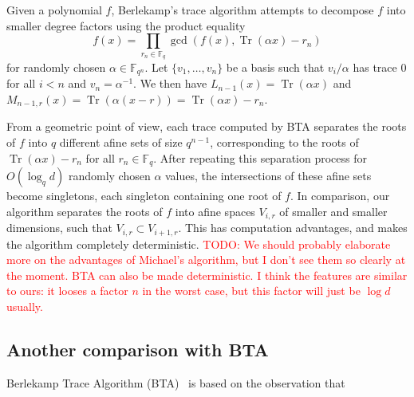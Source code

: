\documentclass{sig-alternate}
\newcommand{\ff}[1]{\mathbb{F}_{#1}}
\newcommand{\fq}{\ff{q}}
\newcommand{\fqn}{\ff{q^n}}
\newcommand{\dd}{d}
\newcommand{\qq}{q}
\newcommand{\nn}{n}
\DeclareMathOperator{\Tr}{Tr}
\newcounter{algo}
\newcommand{\todo}[1]{\textcolor{red}{TODO: #1}}
\begin{document}
Given a polynomial $f$, Berlekamp's trace algorithm attempts to decompose $f$ into smaller degree factors using the product equality
$$f(x)=\prod_{r_n\in\fq}\gcd\left(f(x),\Tr(\alpha x)-r_n\right)$$
for randomly chosen $\alpha\in\fqn$.
%
Let $\{v_1,\ldots,v_{\nn}\}$ be a basis such that $v_i/\alpha$ has trace 0 for all $i<\nn$ and $v_\nn=\alpha^{-1}$. We then have $L_{\nn-1}(x)=\Tr(\alpha x)$ and $M_{\nn-1,r}(x)=\Tr(\alpha (x-r))=\Tr(\alpha x)-r_\nn$.

From a geometric point of view, each trace computed by BTA separates the roots of $f$ into $q$ different afine sets of size $\qq^{\nn-1}$, corresponding to the roots of $\Tr(\alpha x)-r_\nn$ for all $r_\nn\in\fq$. After repeating this separation process for $O(\log_\qq\dd)$  randomly chosen $\alpha$ values, the intersections of these afine sets become singletons, each singleton containing one root of $f$. 
%
In comparison, our algorithm separates the roots of $f$ into afine spaces $V_{i,r}$ of smaller and smaller dimensions, such that $V_{i,r}\subset V_{i+1,r}$. This has computation advantages, and makes the algorithm completely deterministic.
%
\todo{We should probably elaborate more on the advantages of Michael's algorithm, but I don't see them so clearly at the moment. BTA can also be made deterministic. I think the features are similar to ours: it looses a factor $n$ in the worst case, but this factor will just be $\log d$ usually.}


\subsection{Another comparison with BTA}


Berlekamp Trace Algorithm (BTA)~\cite{berl70} is based on the observation that
\end{document}
